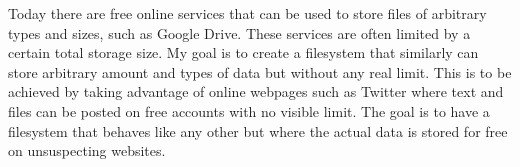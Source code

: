 



Today there are free online services that can be used to store files of arbitrary types and sizes, such as Google Drive. These services are often limited by a certain total storage size. My goal is to create a filesystem that similarly can store arbitrary amount and types of data but without any real limit. This is to be achieved by taking advantage of online webpages such as Twitter where text and files can be posted on free accounts with no visible limit. The goal is to have a filesystem that behaves like any other but where the actual data is stored for free on unsuspecting websites.
